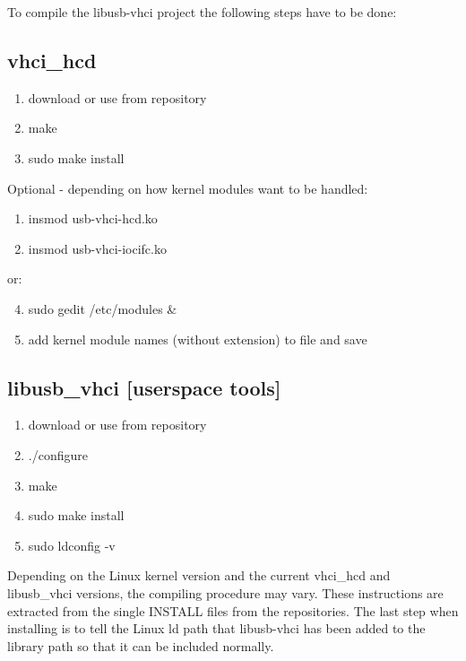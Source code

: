 To compile the libusb-vhci project the following steps have to be done:

\subsection{vhci\_hcd}

\begin{enumerate}
 \item download or use from repository
 \item make
 \item sudo make install
\end{enumerate}

Optional - depending on how kernel modules want to be handled:

\begin{enumerate}[resume]
 \item insmod usb-vhci-hcd.ko
 \item insmod usb-vhci-iocifc.ko
\end{enumerate}
 
or:
 
\begin{enumerate}
\setcounter{enumi}{3}
 \item sudo gedit /etc/modules \&
 \item add kernel module names (without extension) to file and save
\end{enumerate}

\subsection{libusb\_vhci [userspace tools]}

\begin{enumerate}
 \item download or use from repository
 \item ./configure
 \item make
 \item sudo make install
 \item sudo ldconfig -v 
\end{enumerate}

Depending on the Linux kernel version and the current vhci\_hcd and libusb\_vhci versions, 
the compiling procedure may vary. These instructions are extracted from the single INSTALL 
files from the repositories. The last step when installing is to tell the Linux ld path that 
libusb-vhci has been added to the library path so that it can be included normally.

